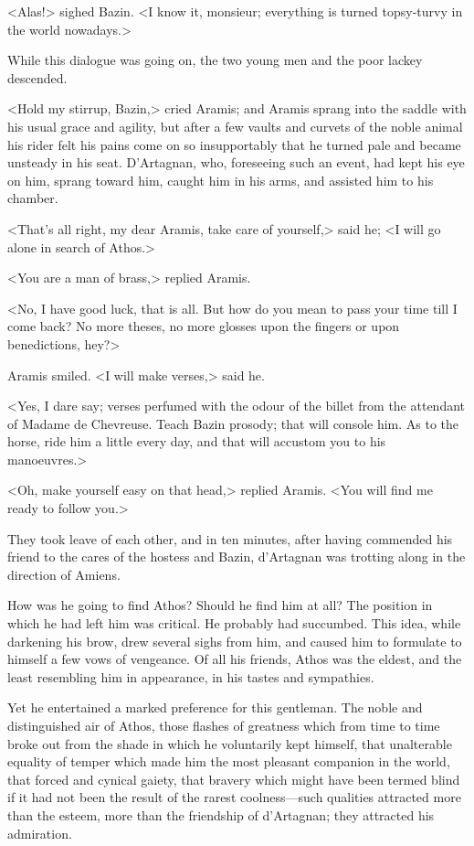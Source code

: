 <Alas!> sighed Bazin. <I know it, monsieur; everything is turned topsy-turvy in the world nowadays.> 

While this dialogue was going on, the two young men and the poor lackey descended. 

<Hold my stirrup, Bazin,> cried Aramis; and Aramis sprang into the saddle with his usual grace and agility, but after a few vaults and curvets of the noble animal his rider felt his pains come on so insupportably that he turned pale and became unsteady in his seat. D'Artagnan, who, foreseeing such an event, had kept his eye on him, sprang toward him, caught him in his arms, and assisted him to his chamber. 

<That's all right, my dear Aramis, take care of yourself,> said he; <I will go alone in search of Athos.> 

<You are a man of brass,> replied Aramis. 

<No, I have good luck, that is all. But how do you mean to pass your time till I come back? No more theses, no more glosses upon the fingers or upon benedictions, hey?> 

Aramis smiled. <I will make verses,> said he. 

<Yes, I dare say; verses perfumed with the odour of the billet from the attendant of Madame de Chevreuse. Teach Bazin prosody; that will console him. As to the horse, ride him a little every day, and that will accustom you to his manoeuvres.> 

<Oh, make yourself easy on that head,> replied Aramis. <You will find me ready to follow you.> 

They took leave of each other, and in ten minutes, after having commended his friend to the cares of the hostess and Bazin, d'Artagnan was trotting along in the direction of Amiens. 

How was he going to find Athos? Should he find him at all? The position in which he had left him was critical. He probably had succumbed. This idea, while darkening his brow, drew several sighs from him, and caused him to formulate to himself a few vows of vengeance. Of all his friends, Athos was the eldest, and the least resembling him in appearance, in his tastes and sympathies. 

Yet he entertained a marked preference for this gentleman. The noble and distinguished air of Athos, those flashes of greatness which from time to time broke out from the shade in which he voluntarily kept himself, that unalterable equality of temper which made him the most pleasant companion in the world, that forced and cynical gaiety, that bravery which might have been termed blind if it had not been the result of the rarest coolness---such qualities attracted more than the esteem, more than the friendship of d'Artagnan; they attracted his admiration. 

